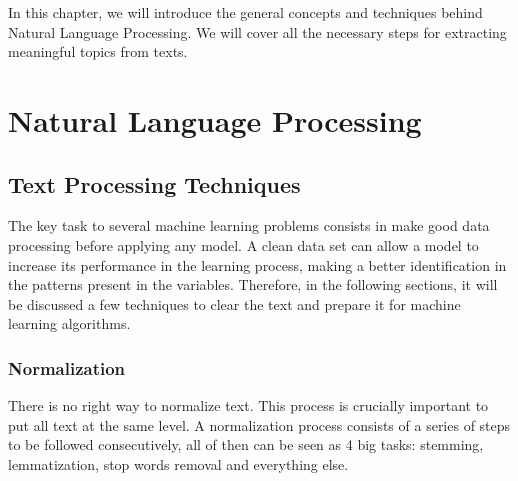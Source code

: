 In this chapter, we will introduce the general concepts and techniques behind Natural Language Processing. We will cover all the necessary steps for extracting meaningful topics from texts. %


\section{Natural Language Processing}

	

	\subsection{Text Processing Techniques}
	
	The key task to several machine learning problems consists in make good data processing before applying any model. A clean data set can allow a model to increase its performance in the learning process, making a better identification in the patterns present in the variables. Therefore, in the following sections, it will be discussed a few techniques to clear the text and prepare it for machine learning algorithms.
	
	\subsubsection{Normalization}
	
	There is no right way to normalize text. This process is crucially important to put all text at the same level. A normalization process consists of a series of steps to be followed consecutively, all of then can be seen as 4 big tasks: stemming, lemmatization, stop words removal and everything else.
	
